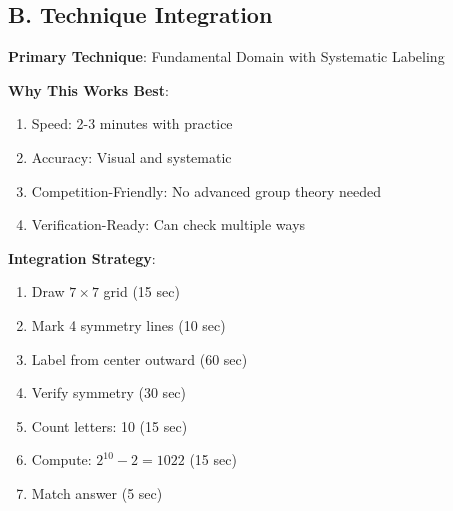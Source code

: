 \documentclass[]{article}
\begin{document}
\begin{techniquesbox}
\subsection*{B. Technique Integration}

\textbf{Primary Technique}: Fundamental Domain with Systematic Labeling

\textbf{Why This Works Best}:
\begin{enumerate}
    \item Speed: 2-3 minutes with practice
    \item Accuracy: Visual and systematic
    \item Competition-Friendly: No advanced group theory needed
    \item Verification-Ready: Can check multiple ways
\end{enumerate}

\textbf{Integration Strategy}:
\begin{enumerate}
    \item Draw $7 \times 7$ grid (15 sec)
    \item Mark 4 symmetry lines (10 sec)
    \item Label from center outward (60 sec)
    \item Verify symmetry (30 sec)
    \item Count letters: 10 (15 sec)
    \item Compute: $2^{10} - 2 = 1022$ (15 sec)
    \item Match answer (5 sec)
\end{enumerate}
\end{techniquesbox}
\end{document}
